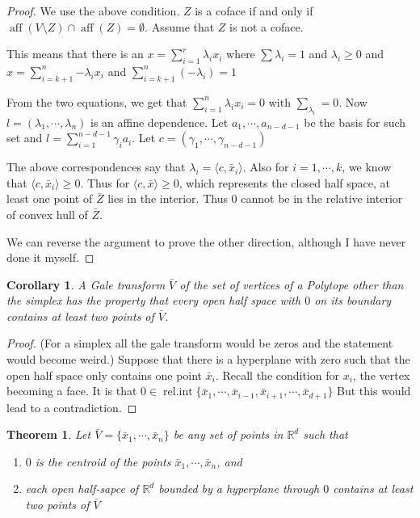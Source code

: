 \documentclass[a4paper,10pt,landscape]{article}
\newtheorem{theorem}{Theorem}[section]
\newtheorem{corollary}{Corollary}[theorem]
\def\R{\mathbb{R}}
\def\aff{\operatorname{aff}}
\begin{document}
\begin{multicols}{3}
  \begin{proof}
    We use the above condition. $Z$ is a coface if and only if $\aff(V \setminus
    Z) \cap \aff(Z) = \emptyset$. Assume that $Z$ is not a coface.

    This means that there is an $x = \sum_{i=1}^{r}{\lambda_i x_i}$
    where $\sum \lambda_i = 1$ and $\lambda_i \ge 0$ and $x = \sum_{i=k +
      1}^{n}{-\lambda_i x_i}$ and $\sum_{i=k+1}^{n}(-\lambda_i) = 1$

    From the two equations, we get that $\sum_{i=1}^{n} \lambda_i x_i = 0$ with
    $\sum_{\lambda_i} = 0$. Now $l = (\lambda_1, \cdots, \lambda_n)$ is an
    affine dependence. Let $a_1, \cdots, a_{n-d-1}$ be the basis for such set
    and $l = \sum_{i=1}^{n-d-1} \gamma_i a_{i}$. Let $c = (\gamma_1, \cdots,
    \gamma_{n - d- 1})$

    The above correspondences say that $\lambda_i = \langle c,
    \bar{x}_i\rangle$. Also for $i = 1, \cdots, k$, we know that $\langle c,
    \bar{x}_i\rangle \ge 0$. Thus for $\langle c, \bar{x}\rangle \ge 0$, which
    represents the closed half space, at least one point of $\bar{Z}$ lies in
    the interior. Thus $0$ cannot be in the relative interior of convex hull of
    $\bar{Z}$.

    We can reverse the argument to prove the other direction, although I have
    never done it myself.
  \end{proof}

  \begin{corollary}
    A Gale transform $\bar{V}$ of the set of vertices of a Polytope other than
    the simplex has the property that every open half space with $0$ on its
    boundary contains at least two points of $\bar{V}$.
  \end{corollary}
  \begin{proof}
    (For a simplex all the gale transform would be zeros and the statement would
    become weird.) Suppose that there is a hyperplane with zero such that the
    open half space only contains one point $\bar{x}_i$. Recall the condition
    for $x_i$, the vertex becoming a face. It is that $0 \in \operatorname{rel.
      int}\{\bar{x}_1, \cdots, \bar{x}_{i-1}, \bar{x}_{i+1}, \cdots,
    \bar{x}_{d+1}\}$ But this would lead to a contradiction.
  \end{proof}

  \begin{theorem}
    Let $\bar{V} = \{\bar{x}_1, \cdots, \bar{x}_n\}$ be any set of points in
    $\R^d$ such that 
    \begin{enumerate}
      \item $0$ is the centroid of the points $\bar{x}_1, \cdots, \bar{x}_n$,
        and 
      \item each open half-sapce of $\R^d$ bounded by a hyperplane through $0$
        contains at least two points of $\bar{V}$
    \end{enumerate}


\end{theorem}
\end{multicols}
\end{document}
